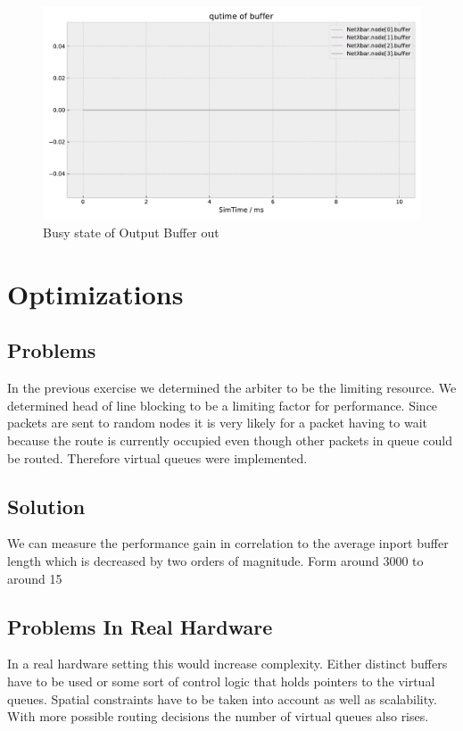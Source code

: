 \documentclass[]{scrartcl}
\begin{document}
    \begin{figure}[H]
        \centering
        \includegraphics[width=\columnwidth, page=9]{../../python/results/preopt-General-0}
        \caption{Busy state of Output Buffer out}%
        \label{fig:../../python/results/preopt-General-0}
    \end{figure}
\section{Optimizations}
\subsection{Problems}
In the previous exercise we determined the arbiter to be the limiting resource.
We determined head of line blocking to be a limiting factor for performance.
Since packets are sent to random nodes it is very likely for a packet having to
wait because the route is currently occupied even though other packets in queue
could be routed.
Therefore virtual queues were implemented.

\subsection{Solution}
We can measure the performance gain in correlation to the average inport buffer
length which is decreased by two orders of magnitude. Form around 3000 to around
15

\subsection{Problems In Real Hardware}
In a real hardware setting this would increase complexity.
Either distinct buffers have to be used or some sort of control logic that holds
pointers to the virtual queues. Spatial constraints have to be taken into account
as well as scalability. With more possible routing decisions the number of virtual
queues also rises.
\end{document}
